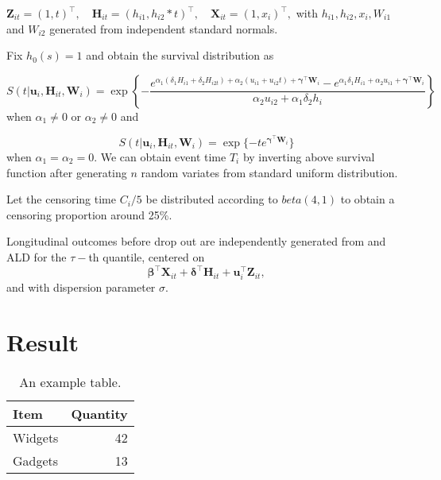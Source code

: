 \documentclass{article}
\begin{document}
${\boldsymbol Z}_{it}=(1, t)^{\top},\hspace{1em} {\boldsymbol H}_{it}=(h_{i1}, h_{i2}*t)^{\top},\hspace{1em} {\boldsymbol X}_{it}=(1, x_i)^{\top},$ with $h_{i1}, h_{i2}, x_i, W_{i1}$ and $W_{i2}$ generated from independent standard normals. \par

Fix $h_0(s)=1$ and obtain the survival distribution as 

\[S(t|\boldsymbol{u}_i, {\boldsymbol H}_{it}, {\boldsymbol W}_i)=\exp\left\{-\frac{e^{\alpha_1(\delta_1H_{i1}+\delta_2H_{i2t}) + \alpha_2(u_{i1}+u_{i2}t) + \boldsymbol{\gamma}^{\top}\boldsymbol{W}_i} - e^{\alpha_1\delta_1H_{i1}+\alpha_2u_{i1} + \boldsymbol{\gamma}^{\top}\boldsymbol{W}_i}}{\alpha_2u_{i2}+\alpha_1\delta_2h_i}\right\}\] when $\alpha_1\ne0$ or $\alpha_2\ne0$ and 

\[S(t|\boldsymbol{u}_i, {\boldsymbol H}_{it}, {\boldsymbol W}_i) =  \exp\{-te^{\boldsymbol{\gamma}^{\top}\boldsymbol{W}_i}\}\]
when $\alpha_1=\alpha_2=0.$ We can obtain event time $T_i$ by inverting above survival function after generating $n$ random variates from standard uniform distribution.\par

Let the censoring time $C_i/5$ be distributed according to $beta(4,1)$ to obtain a censoring proportion around 25\%. \par

Longitudinal outcomes before drop out are independently generated from and ALD for the $\tau-$th quantile, centered on 
\[\boldsymbol{\beta}^{\top}{\boldsymbol X}_{it} + \boldsymbol{\delta}^{\top}{\boldsymbol H}_{it} + {\boldsymbol u}_i^{\top}{\boldsymbol Z}_{it},\] and with dispersion parameter $\sigma$.




\section{Result}
\begin{table}[H]
\centering
\begin{tabular}{l|r}
Item & Quantity \\\hline
Widgets & 42 \\
Gadgets & 13
\end{tabular}
\caption{\label{tab:widgets}An example table.}
\end{table}
\end{document}
